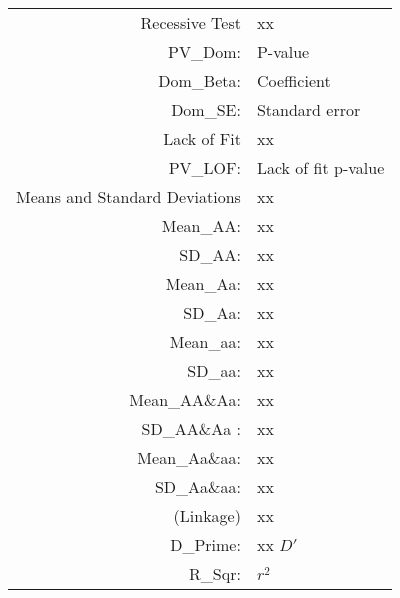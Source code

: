 \begin{supertabular}{r p{5in}}
   Recessive Test & xx ~ \\
      PV\_Dom: & P-value \\
      Dom\_Beta: & Coefficient \\
      Dom\_SE: & Standard error \\[1em]

   Lack of Fit & xx ~ \\
      PV\_LOF: & Lack of fit p-value \\[1em]

   Means and Standard Deviations & xx ~ \\
      Mean\_AA: & xx \\
      SD\_AA: & xx \\
      Mean\_Aa: & xx \\
      SD\_Aa: & xx \\
      Mean\_aa: & xx \\
      SD\_aa: & xx  \\
      Mean\_AA\&Aa: & xx  \\
      SD\_AA\&Aa : & xx \\
      Mean\_Aa\&aa: & xx  \\
      SD\_Aa\&aa: & xx  \\ [1em]

   (Linkage) & xx ~ \\
      D\_Prime: & xx $D'$ \\
      R\_Sqr: & $r^2$  \\
 
\end{supertabular}

